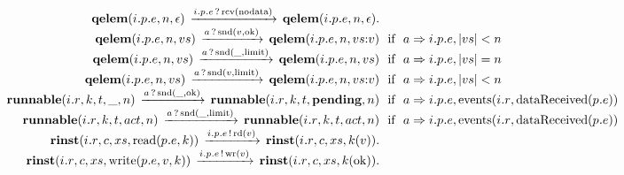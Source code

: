 \[\begin{array}{r@{}c@{}llllll}
\\\Pfact{\Tstep{\Tqelem{\Tep{\Tvar{E}}{\Tvar{P}}{\Tvar{I}}}{\Tvar{N}}{\Teps}}{\Thear{\Tep{\Tvar{E}}{\Tvar{P}}{\Tvar{I}}}{\Trcv{\Tnodata}}}{\Tqelem{\Tep{\Tvar{E}}{\Tvar{P}}{\Tvar{I}}}{\Tvar{N}}{\Teps}}}
\\\Prule{\Tstep{\Tqelem{\Tep{\Tvar{E}}{\Tvar{P}}{\Tvar{I}}}{\Tvar{N}}{\Tvar{Vs}}}{\Thear{\Tvar{A}}{\Tsnd{\Tvar{V}}{\Tok}}}{\Tqelem{\Tep{\Tvar{E}}{\Tvar{P}}{\Tvar{I}}}{\Tvar{N}}{\Tseq{\Tvar{Vs}}{\Tvar{V}}}}}{\Tconnect{\Tvar{A}}{\Tep{\Tvar{E}}{\Tvar{P}}{\Tvar{I}}},\Tless{\Tlength{\Tvar{Vs}}}{\Tvar{N}}}
\\\Prule{\Tstep{\Tqelem{\Tep{\Tvar{E}}{\Tvar{P}}{\Tvar{I}}}{\Tvar{N}}{\Tvar{Vs}}}{\Thear{\Tvar{A}}{\Tsnd{\_}{\Tlimit}}}{\Tqelem{\Tep{\Tvar{E}}{\Tvar{P}}{\Tvar{I}}}{\Tvar{N}}{\Tvar{Vs}}}}{\Tconnect{\Tvar{A}}{\Tep{\Tvar{E}}{\Tvar{P}}{\Tvar{I}}},\Tequal{\Tlength{\Tvar{Vs}}}{\Tvar{N}}}
\\\Prule{\Tstep{\Tqelem{\Tep{\Tvar{E}}{\Tvar{P}}{\Tvar{I}}}{\Tvar{N}}{\Tvar{Vs}}}{\Thear{\Tvar{A}}{\Tsnd{\Tvar{V}}{\Tlimit}}}{\Tqelem{\Tep{\Tvar{E}}{\Tvar{P}}{\Tvar{I}}}{\Tvar{N}}{\Tseq{\Tvar{Vs}}{\Tvar{V}}}}}{\Tconnect{\Tvar{A}}{\Tep{\Tvar{E}}{\Tvar{P}}{\Tvar{I}}},\Tless{\Tlength{\Tvar{Vs}}}{\Tvar{N}}}
\\\Prule{\Tstep{\Trunnable{\Tr{\Tvar{R}}{\Tvar{I}}}{\Tvar{K}}{\Tvar{T}}{\_}{\Tvar{N}}}{\Thear{\Tvar{A}}{\Tsnd{\_}{\Tok}}}{\Trunnable{\Tr{\Tvar{R}}{\Tvar{I}}}{\Tvar{K}}{\Tvar{T}}{\Tpending}{\Tvar{N}}}}{\Tconnect{\Tvar{A}}{\Tep{\Tvar{E}}{\Tvar{P}}{\Tvar{I}}},\Tevents{\Tr{\Tvar{R}}{\Tvar{I}}}{\TdataReceived{\Te{\Tvar{E}}{\Tvar{P}}}}}
\\\Prule{\Tstep{\Trunnable{\Tr{\Tvar{R}}{\Tvar{I}}}{\Tvar{K}}{\Tvar{T}}{\Tvar{Act}}{\Tvar{N}}}{\Thear{\Tvar{A}}{\Tsnd{\_}{\Tlimit}}}{\Trunnable{\Tr{\Tvar{R}}{\Tvar{I}}}{\Tvar{K}}{\Tvar{T}}{\Tvar{Act}}{\Tvar{N}}}}{\Tconnect{\Tvar{A}}{\Tep{\Tvar{E}}{\Tvar{P}}{\Tvar{I}}},\Tevents{\Tr{\Tvar{R}}{\Tvar{I}}}{\TdataReceived{\Te{\Tvar{E}}{\Tvar{P}}}}}
\\\Pfact{\Tstep{\Trinst{\Tr{\Tvar{R}}{\Tvar{I}}}{\Tvar{C}}{\Tvar{Xs}}{\TrteRead{\Te{\Tvar{E}}{\Tvar{P}}}{\Tvar{K}}}}{\Tsay{\Tep{\Tvar{E}}{\Tvar{P}}{\Tvar{I}}}{\Trd{\Tvar{V}}}}{\Trinst{\Tr{\Tvar{R}}{\Tvar{I}}}{\Tvar{C}}{\Tvar{Xs}}{\Tap{\Tvar{K}}{\Tvar{V}}}}}
\\\Pfact{\Tstep{\Trinst{\Tr{\Tvar{R}}{\Tvar{I}}}{\Tvar{C}}{\Tvar{Xs}}{\TrteWrite{\Te{\Tvar{E}}{\Tvar{P}}}{\Tvar{V}}{\Tvar{K}}}}{\Tsay{\Tep{\Tvar{E}}{\Tvar{P}}{\Tvar{I}}}{\Twr{\Tvar{V}}}}{\Trinst{\Tr{\Tvar{R}}{\Tvar{I}}}{\Tvar{C}}{\Tvar{Xs}}{\Tap{\Tvar{K}}{\Tok}}}}

\end{array}\]
